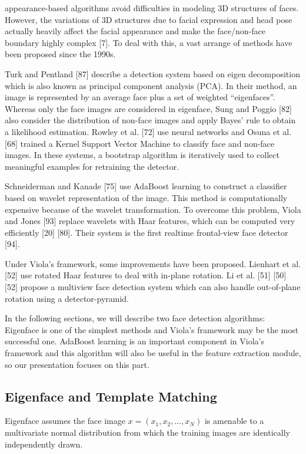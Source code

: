 \documentclass[12pt, twoside]{report}
\begin{document}
	\large{appearance-based algorithms avoid difficulties in modeling 3D structures of faces. However, the variations of 3D structures due to facial expression and head pose actually heavily affect the facial appearance and make the face/non-face boundary highly complex [7]. To deal with this, a vast arrange of methods have been proposed since the 1990s.}\par
	\large{Turk and Pentland [87] describe a detection system based on eigen decomposition which is also known as principal component analysis (PCA). In their method, an image is represented by an average face plus a set of weighted “eigenfaces”. Whereas only the face images are considered in eigenface, Sung and Poggio [82] also consider the distribution of non-face images and apply Bayes’ rule to obtain a likelihood estimation. Rowley et al. [72] use neural networks and Osuna et al. [68] trained a Kernel Support Vector Machine to classify face and non-face images. In these systems, a bootstrap algorithm is iteratively used to collect meaningful examples for retraining the detector.}\par
	\large{Schneiderman and Kanade [75] use AdaBoost learning to construct a classifier based on wavelet representation of the image. This method is computationally expensive because of the wavelet transformation. To overcome this problem, Viola and Jones [93] replace wavelets with Haar features, which can be computed very efficiently [20] [80]. Their system is the first realtime frontal-view face detector [94].}\par
	\large{Under Viola’s framework, some improvements have been proposed. Lienhart et al. [52] use rotated Haar features to deal with in-plane rotation. Li et al. [51] [50] [52] propose a multiview face detection system which can also handle out-of-plane rotation using a detector-pyramid.}\par
	\large{In the following sections, we will describe two face detection algorithms: Eigenface is one of the simplest methods and Viola’s framework may be the most successful one. AdaBoost learning is an important component in Viola’s framework and this algorithm will also be useful in the feature extraction module, so our presentation focuses on this part.}
			
	\subsection{Eigenface and Template Matching}
	\large{Eigenface assumes the face image $x = (x_1,x_2,...,x_N)$ is amenable to a multivariate normal distribution from which the training images are identically independently drawn.}
	
\end{document}
